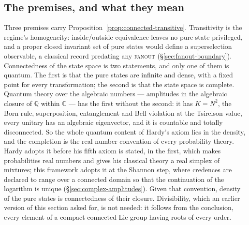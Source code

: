 \subsection{The premises, and what they mean}

Three premises carry Proposition~\ref{prop:connected-transitive}. Transitivity is the regime's
homogeneity: inside/outside equivalence leaves no pure state privileged, and a proper closed
invariant set of pure states would define a superselection observable, a classical record
predating any \textsc{fanout} (\S\ref{sec:fanout-boundary}). Connectedness of the state space is two statements, and only one of them is quantum. The first
is that the pure states are infinite and dense, with a fixed point for every transformation; the
second is that the state space is complete. Quantum theory over the algebraic numbers ---
amplitudes in the algebraic closure of $\mathbb{Q}$ within $\mathbb{C}$ --- has the first
without the second: it has $K = N^{2}$, the Born rule, superposition, entanglement and Bell
violation at the Tsirelson value, every unitary has an algebraic eigenvector, and it is
countable and totally disconnected. So the whole quantum content of Hardy's axiom lies in the
density, and the completion is the real-number convention of every probability theory. Hardy
adopts it before his fifth axiom is stated, in the first, which makes probabilities real numbers
and gives his classical theory a real simplex of mixtures; this framework adopts it at the
Shannon step, where credences are declared to range over a connected domain so that the
continuation of the logarithm is unique (\S\ref{sec:complex-amplitudes}). Given that convention,
density of the pure states is connectedness of their closure. Divisibility, which an earlier
version of this section asked for, is not needed: it follows from the conclusion, every element
of a compact connected Lie group having roots of every order.

